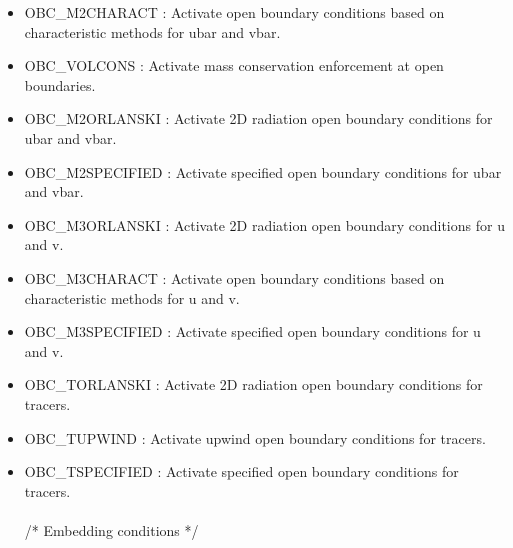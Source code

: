 \begin{itemize}
\item OBC\_M2CHARACT  :  Activate open boundary conditions based on characteristic methods 
for ubar and vbar.
\item OBC\_VOLCONS : Activate mass conservation enforcement at open boundaries.
\item OBC\_M2ORLANSKI : Activate 2D radiation open boundary conditions for ubar and vbar.
\item OBC\_M2SPECIFIED : Activate specified open boundary conditions for ubar and vbar.
\item OBC\_M3ORLANSKI : Activate 2D radiation open boundary conditions for u and v.
\item OBC\_M3CHARACT : Activate open boundary conditions based on characteristic methods 
for u and v.
\item OBC\_M3SPECIFIED : Activate specified open boundary conditions for u and v.
\item OBC\_TORLANSKI :  Activate 2D radiation open boundary conditions for tracers.
\item OBC\_TUPWIND : Activate upwind open boundary conditions for tracers.
\item OBC\_TSPECIFIED : Activate specified open boundary conditions for tracers.
\\ \\ /*                       Embedding conditions */


\end{itemize}
